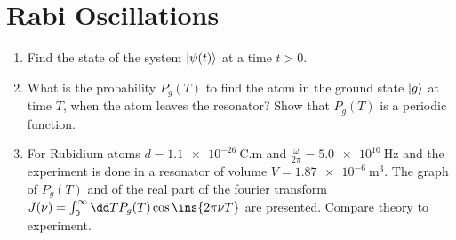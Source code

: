 \clearpage
\section{Rabi Oscillations}
\begin{colbox}
    \begin{enumerate}
        \item Find the state of the system $\ket{\psi(t)}$ at a time $t>0$.
        \item What is the probability $P_g(T)$ to find the atom in the ground state $\ket{g}$ at time $T$, when the atom leaves the resonator? Show that $P_g(T)$ is a periodic function.
        \item For Rubidium atoms $d=\qty{1.1e-26}{\coulomb.\meter}$ and $\frac{\omega}{2\pi}=\qty{5.0e10}{\hertz}$ and the experiment is done in a resonator of volume $V=\qty{1.87e-6}{\meter\cubed}$. The graph of $P_g(T)$ and of the real part of the fourier transform $J(\nu)=\int_0^\infty\dd TP_g(T)\cos\ins{2\pi\nu T}$ are presented. Compare theory to experiment.
    \end{enumerate}
\end{colbox}
